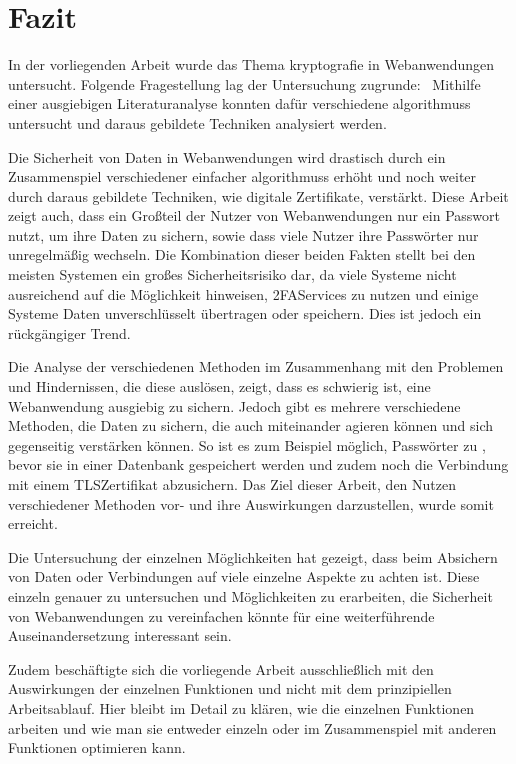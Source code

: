 \newpage
\section{Fazit}\label{sec:fazit}

In der vorliegenden Arbeit wurde das Thema \Gls{kryptografie} in Webanwendungen untersucht. 
Folgende Fragestellung lag der Untersuchung zugrunde: \myForschungsfrage\
Mithilfe einer ausgiebigen Literaturanalyse konnten dafür verschiedene  \glspl{algorithmus} untersucht und daraus gebildete Techniken analysiert werden.

Die Sicherheit von Daten in Webanwendungen wird drastisch durch ein Zusammenspiel verschiedener einfacher \glspl{algorithmus} erhöht und noch weiter durch daraus gebildete Techniken, wie \zb digitale Zertifikate, verstärkt.
Diese Arbeit zeigt auch, dass ein Großteil der Nutzer von Webanwendungen nur ein Passwort nutzt, um ihre Daten zu sichern, sowie dass viele Nutzer ihre Passwörter nur unregelmäßig wechseln.
Die Kombination dieser beiden Fakten stellt bei den meisten Systemen ein großes Sicherheitsrisiko dar, da viele Systeme \zb nicht ausreichend auf die Möglichkeit hinweisen, \ac{2FA}\nonbreakdash Services zu nutzen und einige Systeme Daten unverschlüsselt übertragen oder speichern.
Dies ist jedoch ein rückgängiger Trend.

Die Analyse der verschiedenen  Methoden im Zusammenhang mit den Problemen und Hindernissen, die diese auslösen, zeigt, dass es schwierig ist, eine Webanwendung ausgiebig zu sichern.
Jedoch gibt es mehrere verschiedene Methoden, die Daten zu sichern, die auch miteinander agieren können und sich gegenseitig verstärken können.
So ist es zum Beispiel möglich, Passwörter zu \glsdisp{hashfunc}{hashen}, bevor sie in einer Datenbank gespeichert werden und zudem noch die Verbindung mit einem \ac{TLS}\nonbreakdash Zertifikat abzusichern.
Das Ziel dieser Arbeit, den Nutzen verschiedener \glsdisp{kryptografie}{kryptografischer} Methoden vor- und ihre Auswirkungen darzustellen, wurde somit erreicht.

Die Untersuchung der einzelnen Möglichkeiten hat gezeigt, dass beim Absichern von Daten oder Verbindungen auf viele einzelne Aspekte zu achten ist.
Diese einzeln genauer zu untersuchen und Möglichkeiten zu erarbeiten, die Sicherheit von Webanwendungen zu vereinfachen könnte für eine weiterführende Auseinandersetzung interessant sein.

Zudem beschäftigte sich die vorliegende Arbeit ausschließlich mit den Auswirkungen der einzelnen Funktionen und nicht mit dem prinzipiellen Arbeitsablauf.
Hier bleibt im Detail zu klären, wie die einzelnen Funktionen arbeiten und wie man sie entweder einzeln oder im Zusammenspiel mit anderen Funktionen optimieren kann.